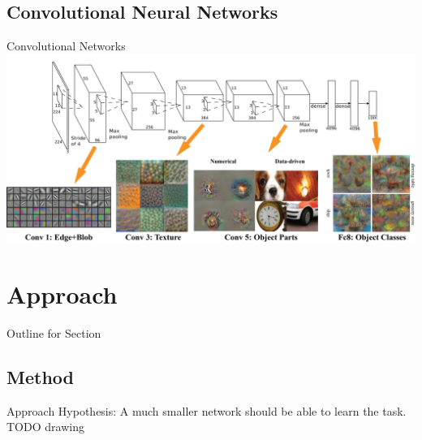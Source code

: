 \documentclass{beamer}
\begin{document}
\begin{darkframes}
	\subsection{Convolutional Neural Networks}
		\begin{frame}{Convolutional Networks}
	\includegraphics[width=\textwidth]{fig/cnn}
\end{frame}

    \section{Approach}
        \begin{frame}{Outline for Section \thesection}
    \tableofcontents[currentsection]
\end{frame}
  \subsection{Method}
    \begin{frame}{Approach}
  Hypothesis: A much smaller network should be able to learn the task.
  TODO drawing
    \end{frame}
    

\end{darkframes}
\end{document}
